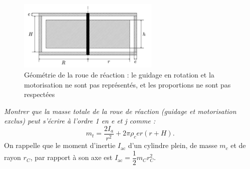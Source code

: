 \begin{figure}[!htb]
\begin{center}
\includegraphics[width=0.6\textwidth]{images/image8.jpg}
\end{center}
\caption{Géométrie de la roue de réaction : le guidage en
rotation et la motorisation ne sont pas représentés, et les proportions
ne sont pas respectées \label{fig8}}
\end{figure}
\fi



\question{\label{q_16}}\textit{ Montrer que la masse totale de la roue de réaction (guidage et
motorisation exclus) peut s'écrire à l'ordre 1 en e et j comme :}
$$
m_t=\dfrac{2 I_a}{r^2}+2\pi\rho_c e r\left(r+H\right).
$$
\ifprof
\else
  On rappelle que le moment d'inertie $I_{\text{ac}}$ d'un cylindre plein, de masse $m_c$ et
  de rayon $r_C$, par rapport à son axe est $I_{\text{ac}}=\dfrac{1}{2}m_Cr_C^2$.
\fi

